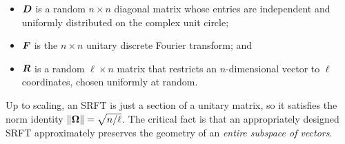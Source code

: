 \documentclass{article}
\begin{document}
\lsp

\begin{itemize}
\item   $\bm{D}$ is a random $n \times n$ diagonal matrix whose
entries are independent and uniformly distributed on the complex
unit circle;

\item   $\bm{F}$ is the $n \times n$ unitary discrete Fourier
transform; and

\item   $\bm{R}$ is a random $\ell \times n$ matrix that
restricts an $n$-dimensional vector to $\ell$ coordinates, chosen
uniformly at random.
\end{itemize}

\lsp

\noindent
Up to scaling, an SRFT is just a section of a unitary matrix,
so it satisfies the norm identity $\left\Vert {\bm{\Omega}} \right\Vert = \sqrt{n/\ell}$.
The critical fact is that an appropriately designed SRFT approximately preserves
the geometry of an \emph{entire subspace of vectors}.





%
\end{document}

